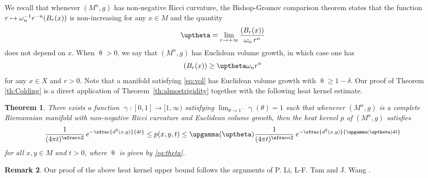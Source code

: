 \documentclass[JEP,XML,SOM,Unicode,published]{cedram}
\newcommand\mto{\mathchoice{\longmapsto}{\mapsto}{\mapsto}{\mapsto}}
\newcommand{\NoChangel}[1]{%
\expandafter\let\csname old\string#1\endcsname=#1
\let#1=\relax
\newcommand{#1}{\mathcode`l="716C\csname old\string#1\endcsname\mathcode`l="7160 }%
}
\theoremstyle{plain}
\newtheorem{theorem}{Theorem}[section]
\theoremstyle{definition}
\newtheorem{remark}[theorem]{Remark}
\DeclareMathOperator{\vol}{vol}\NoChangel{\vol}
\begin{document}
We recall that whenever $(M^n,g)$ has non-negative Ricci curvature, the Bishop-Gromov comparison theorem states that the function $r\mto \omega_n^{-1} r^{-n}\vol (B_r(x))$ is non-increasing for any $x \in M$
and the quantity
\begin{equation}\label{eq:theta}
\uptheta=\lim_{r\to +\infty} \frac{\vol (B_r(x))}{\omega_n\, r^n}
\end{equation}
does not depend on $x$. When $\uptheta>0$, we say that $(M^n,g)$ has Euclidean volume growth, in which case one has
\begin{equation}\label{eq:volumelowerbound}
\vol (B_r(x)) \ge \uptheta \omega_n r^n
\end{equation}
for any $x \in X$ and $r>0$. Note that a manifold satisfying \eqref{eq:vol} has Euclidean volume growth with $\uptheta \ge 1-\delta$. Our proof of Theorem \ref{th:Colding} is a direct application of Theorem~\ref{th:almostrigidity} together with the following heat kernel estimate.
\begin{theorem}\label{th:estimate} There exists a function $\upgamma\colon [0,1]\to [1,\infty)$ satisfying $\lim_{\theta\to 1^-} \upgamma(\theta)=1$ such that
whenever $(M^n,g)$ is a complete Riemannian manifold with non-negative Ricci curvature and Euclidean volume growth, then the heat kernel $p$ of $(M^n,g)$ satisfies
\[
\frac{1}{(4\pi t)^{\sfrac n2}}\,e^{-\sfrac{d^2(x,y)}{4t}}\le p(x,y,t)\le \upgamma(\uptheta) \frac{1}{(4\pi t)^{\sfrac n2}}\,e^{-\sfrac{d^2(x,y)}{\upgamma(\uptheta)4t}}
\]
for all $x,y \in M$ and $t>0$, where $\uptheta$ is given by \eqref{eq:theta}.
\end{theorem}

\begin{remark} Our proof of the above heat kernel upper bound follows the arguments of P. Li, L-F. Tam and J. Wang \cite{LiTamWang}.
\end{remark}
\end{document}
